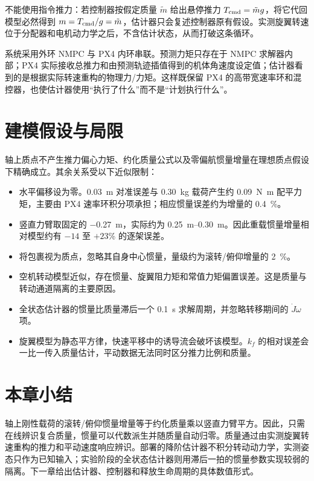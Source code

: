 \documentclass[11pt,UTF8,fontset=none]{ctexrep}
\begin{document}
不能使用指令推力：若控制器按假定质量 $\tilde m$ 给出悬停推力 $T_{\rm cmd}=\tilde m g$，将它代回模型必然得到 $m=T_{\rm cmd}/g=\tilde m$，估计器只会复述控制器原有假设。实测旋翼转速位于分配器和电机动力学之后，不含估计状态，从而打破这条循环。

系统采用外环 NMPC 与 PX4 内环串联。预测力矩只存在于 NMPC 求解器内部；PX4 实际接收总推力和由预测轨迹插值得到的机体角速度设定值；估计器看到的是根据实际转速重构的物理力/力矩。这样既保留 PX4 的高带宽速率环和混控器，也使估计器使用“执行了什么”而不是“计划执行什么”。

\section{建模假设与局限}

轴上质点不产生推力偏心力矩、约化质量公式以及零偏航惯量增量在理想质点假设下精确成立。其余关系受以下近似限制：
\begin{itemize}
\item 水平偏移设为零。\SI{0.03}{\meter} 对准误差与 \SI{0.30}{\kg} 载荷产生约 \SI{0.09}{\newton\meter} 配平力矩，主要由 PX4 速率环积分项承担；相应惯量误差约为增量的 \SI{0.4}{\percent}。
\item 竖直力臂取固定的 \SI{-0.27}{\meter}，实际约为 \SIrange{0.25}{0.30}{\meter}。因此重载惯量增量相对模型约有 $-14$ 至 $+23$\% 的逐架误差。
\item 将包裹视为质点，忽略其自身中心惯量，量级约为滚转/俯仰增量的 \SI{2}{\percent}。
\item 空机转动模型近似，存在惯量、旋翼阻力矩和常值力矩偏置误差。这是质量与转动通道隔离的主要原因。
\item 全状态估计器的惯量比质量滞后一个 \SI{0.1}{\second} 求解周期，并忽略转移期间的 $\dot J\omega$ 项。
\item 旋翼模型为静态平方律，快速平移中的诱导流会破坏该模型。$k_f$ 的相对误差会一比一传入质量估计，平动数据无法同时区分推力比例和质量。
\end{itemize}

\section{本章小结}

轴上刚性载荷的滚转/俯仰惯量增量等于约化质量乘以竖直力臂平方。因此，只需在线辨识复合质量，惯量可以代数派生并随质量自动归零。质量通过由实测旋翼转速重构的推力和平动速度响应辨识。部署的降阶估计器不积分转动动力学，实测姿态只作为已知输入；实验阶段的全状态估计器则用滞后一拍的惯量参数实现较弱的隔离。下一章给出估计器、控制器和释放生命周期的具体数值形式。
\end{document}
